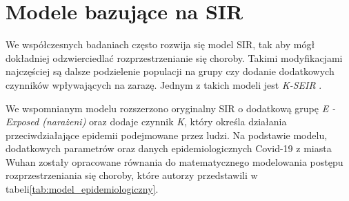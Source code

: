 \section{\textbf{Modele bazujące na SIR}}

We współczesnych badaniach często rozwija się model SIR, tak aby mógł dokładniej odzwierciedlać rozprzestrzenianie się choroby. Takimi modyfikacjami najczęściej są dalsze podzielenie populacji na grupy czy dodanie dodatkowych czynników wpływających na zarazę. Jednym z takich modeli jest \textit {K-SEIR}
\cite{bib:artykul}.

We wspomnianym modelu rozszerzono oryginalny SIR o dodatkową grupę \textit { E - Exposed (narażeni)} oraz dodaje czynnik \textit {K}, który określa działania przeciwdziałające epidemii podejmowane przez ludzi. Na podstawie modelu, dodatkowych parametrów oraz danych epidemiologicznych Covid-19 z miasta Wuhan zostały opracowane równania do matematycznego modelowania postępu rozprzestrzeniania się choroby, które autorzy przedstawili w tabeli\ref{tab:model_epidemiologiczny}.

